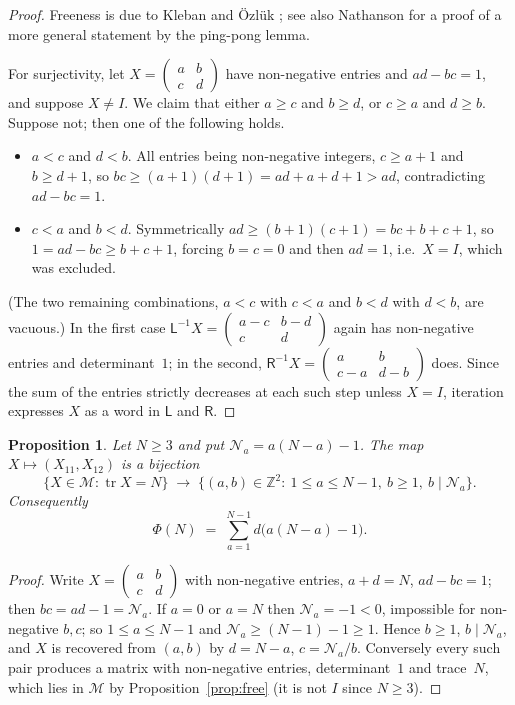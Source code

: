 \documentclass[11pt,reqno]{amsart}
\theoremstyle{plain}
\newtheorem{proposition}[theorem]{Proposition}
\theoremstyle{definition}
\newcommand{\Z}{\mathbb{Z}}
\newcommand{\Ll}{\mathsf{L}}
\newcommand{\Rr}{\mathsf{R}}
\newcommand{\Mon}{\mathcal{M}}
\newcommand{\Nn}{\mathcal{N}}
\newcommand{\tr}{\operatorname{tr}}
\newcommand{\sqm}[4]{\left(\begin{smallmatrix}#1&#2\\#3&#4\end{smallmatrix}\right)}
\begin{document}
\begin{proof}
Freeness is due to Kleban and \"Ozl\"uk \cite{KO}; see also Nathanson \cite{Nathanson}
for a proof of a more general statement by the ping-pong lemma.

For surjectivity, let $X=\sqm{a}{b}{c}{d}$ have non-negative entries and $ad-bc=1$, and
suppose $X\neq I$. We claim that either $a\ge c$ and $b\ge d$, or $c\ge a$ and $d\ge b$.
Suppose not; then one of the following holds.
\begin{itemize}
\item $a<c$ and $d<b$. All entries being non-negative integers, $c\ge a+1$ and
$b\ge d+1$, so $bc\ge(a+1)(d+1)=ad+a+d+1>ad$, contradicting $ad-bc=1$.
\item $c<a$ and $b<d$. Symmetrically $ad\ge(b+1)(c+1)=bc+b+c+1$, so
$1=ad-bc\ge b+c+1$, forcing $b=c=0$ and then $ad=1$, i.e.\ $X=I$, which was excluded.
\end{itemize}
(The two remaining combinations, $a<c$ with $c<a$ and $b<d$ with $d<b$, are vacuous.)
In the first case $\Ll^{-1}X=\sqm{a-c}{b-d}{c}{d}$ again has non-negative entries and
determinant~$1$; in the second, $\Rr^{-1}X=\sqm{a}{b}{c-a}{d-b}$ does. Since the sum of
the entries strictly decreases at each such step unless $X=I$, iteration expresses $X$
as a word in $\Ll$ and $\Rr$.
\end{proof}

\begin{proposition}\label{prop:fibre}
Let $N\ge3$ and put $\Nn_a=a(N-a)-1$. The map $X\mapsto(X_{11},X_{12})$ is a bijection
\[
  \{X\in\Mon:\tr X=N\}\;\longrightarrow\;
  \bigl\{(a,b)\in\Z^2:\ 1\le a\le N-1,\ b\ge1,\ b\mid \Nn_a\bigr\}.
\]
Consequently
\begin{equation}\label{eq:Phidiv}
  \Phi(N)\;=\;\sum_{a=1}^{N-1}d\bigl(a(N-a)-1\bigr).
\end{equation}
\end{proposition}

\begin{proof}
Write $X=\sqm{a}{b}{c}{d}$ with non-negative entries, $a+d=N$, $ad-bc=1$; then
$bc=ad-1=\Nn_a$. If $a=0$ or $a=N$ then $\Nn_a=-1<0$, impossible for non-negative
$b,c$; so $1\le a\le N-1$ and $\Nn_a\ge (N-1)-1\ge1$. Hence $b\ge1$, $b\mid \Nn_a$, and
$X$ is recovered from $(a,b)$ by $d=N-a$, $c=\Nn_a/b$. Conversely every such pair
produces a matrix with non-negative entries, determinant~$1$ and trace~$N$, which lies
in $\Mon$ by Proposition~\ref{prop:free} (it is not $I$ since $N\ge3$).
\end{proof}
\end{document}
